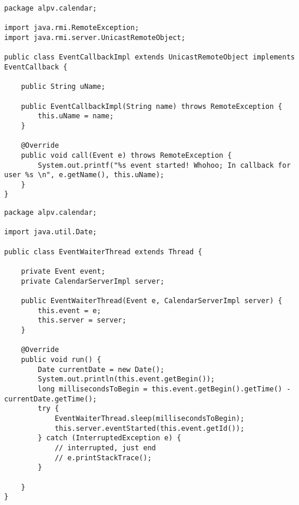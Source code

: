 \begin{lstlisting}[style=java]
package alpv.calendar;

import java.rmi.RemoteException;
import java.rmi.server.UnicastRemoteObject;

public class EventCallbackImpl extends UnicastRemoteObject implements  EventCallback {

    public String uName;

    public EventCallbackImpl(String name) throws RemoteException {
        this.uName = name;
    }

    @Override
    public void call(Event e) throws RemoteException {
        System.out.printf("%s event started! Whohoo; In callback for user %s \n", e.getName(), this.uName);
    }
}

\end{lstlisting}

\begin{lstlisting}[style=java]
package alpv.calendar;

import java.util.Date;

public class EventWaiterThread extends Thread {

    private Event event;
    private CalendarServerImpl server;

    public EventWaiterThread(Event e, CalendarServerImpl server) {
        this.event = e;
        this.server = server;
    }

    @Override
    public void run() {
        Date currentDate = new Date();
        System.out.println(this.event.getBegin());
        long millisecondsToBegin = this.event.getBegin().getTime() - currentDate.getTime();
        try {
            EventWaiterThread.sleep(millisecondsToBegin);
            this.server.eventStarted(this.event.getId());
        } catch (InterruptedException e) {
            // interrupted, just end
            // e.printStackTrace();
        }

    }
}

\end{lstlisting}

